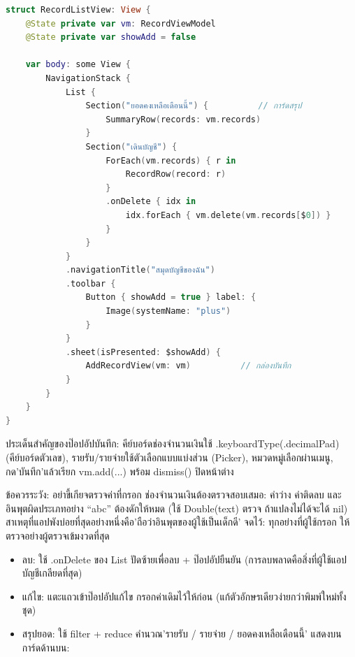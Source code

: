 
\begin{lstlisting}[language=Swift]
struct RecordListView: View {
    @State private var vm: RecordViewModel
    @State private var showAdd = false

    var body: some View {
        NavigationStack {
            List {
                Section("ยอดคงเหลือเดือนนี้") {          // การ์ดสรุป
                    SummaryRow(records: vm.records)
                }
                Section("เดินบัญชี") {
                    ForEach(vm.records) { r in
                        RecordRow(record: r)
                    }
                    .onDelete { idx in
                        idx.forEach { vm.delete(vm.records[$0]) }
                    }
                }
            }
            .navigationTitle("สมุดบัญชีของฉัน")
            .toolbar {
                Button { showAdd = true } label: {
                    Image(systemName: "plus")
                }
            }
            .sheet(isPresented: $showAdd) {
                AddRecordView(vm: vm)          // กล่องบันทึก
            }
        }
    }
}
\end{lstlisting}

ประเด็นสำคัญของป๊อปอัปบันทึก: คีย์บอร์ดช่องจำนวนเงินใช้ .keyboardType(.decimalPad) (คีย์บอร์ดตัวเลข), รายรับ/รายจ่ายใช้ตัวเลือกแบบแบ่งส่วน (Picker), หมวดหมู่เลือกผ่านเมนู, กด'บันทึก'แล้วเรียก vm.add(...) พร้อม dismiss() ปิดหน้าต่าง

\begin{tcbwarn}{ข้อควรระวัง: อย่าขี้เกียจตรวจค่าที่กรอก}
ช่องจำนวนเงินต้องตรวจสอบเสมอ: ค่าว่าง ค่าติดลบ และอินพุตผิดประเภทอย่าง “abc” ต้องดักให้หมด (ใช้ Double(text) ตรวจ ถ้าแปลงไม่ได้จะได้ nil) สาเหตุที่แอปพังบ่อยที่สุดอย่างหนึ่งคือ'ถือว่าอินพุตของผู้ใช้เป็นเด็กดี' จดไว้: ทุกอย่างที่ผู้ใช้กรอก ให้ตรวจอย่างผู้ตรวจเข้มงวดที่สุด

\end{tcbwarn}


\begin{itemize}
  \item ลบ: ใช้ .onDelete ของ List ปัดซ้ายเพื่อลบ + ป๊อปอัปยืนยัน (การลบพลาดคือสิ่งที่ผู้ใช้แอปบัญชีเกลียดที่สุด)
  \item แก้ไข: แตะแถวเข้าป๊อปอัปแก้ไข กรอกค่าเดิมไว้ให้ก่อน (แก้ตัวอักษรเดียวง่ายกว่าพิมพ์ใหม่ทั้งชุด)
  \item สรุปยอด: ใช้ filter + reduce คำนวณ'รายรับ / รายจ่าย / ยอดคงเหลือเดือนนี้' แสดงบนการ์ดด้านบน:
\end{itemize}

